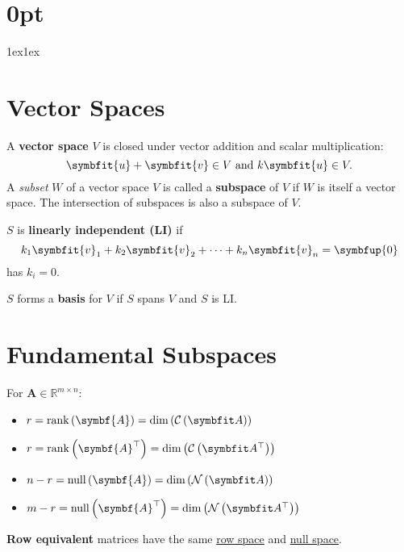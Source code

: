 \documentclass{article}
\begin{document}
\titlespacing*\section{0pt}{1ex}{1ex}
%
\setlength{\textfloatsep}{0pt}
%
\setlength{\abovedisplayskip}{1pt}
\setlength{\belowdisplayskip}{1pt}
%
\begin{minipage}[t]{62.39259259mm}
    \section*{Vector Spaces}
    A \textbf{vector space} \(V\) is closed under vector addition
    and scalar multiplication:
    \begin{equation*}
        \symbfit{u}+\symbfit{v} \in V \ \text{and} \ k\symbfit{u} \in V.
    \end{equation*}
    A \textit{subset} \(W\) of a vector space \(V\) is called a
    \textbf{subspace} of \(V\) if \(W\) is itself a vector space. The
    intersection of subspaces is also a subspace of \(V\).

    \(S\) is \textbf{linearly independent (LI)} if
    \begin{equation*}
        k_1 \symbfit{v}_1 + k_2 \symbfit{v}_2 + \cdots + k_n \symbfit{v}_n = \symbfup{0}
    \end{equation*}
    has \(k_i=0\).

    \(S\) forms a \textbf{basis} for \(V\) if \(S\) spans \(V\) and
    \(S\) is LI.
    \section*{Fundamental Subspaces}
    For \(\symbf{A}\in\mathbb{R}^{m \times n}\):
    \begin{itemize}
        \item \(r = \rank{\left( \symbf{A} \right)} = \dim{\left( \columnspace{A} \right)}\)
        \item \(r = \rank{\left( \symbf{A}^\top \right)} = \dim{\left( \rowspace{A} \right)}\)
        \item \(n - r = \vnull{\left( \symbf{A} \right)}      = \dim{\left( \nullspace{A} \right)}\)
        \item \(m - r = \vnull{\left( \symbf{A}^\top \right)} = \dim{\left( \leftnullspace{A} \right)}\)
    \end{itemize}
    \textbf{Row equivalent} matrices have the same
    \underline{row space} and \underline{null space}.

\end{minipage}
\end{document}
